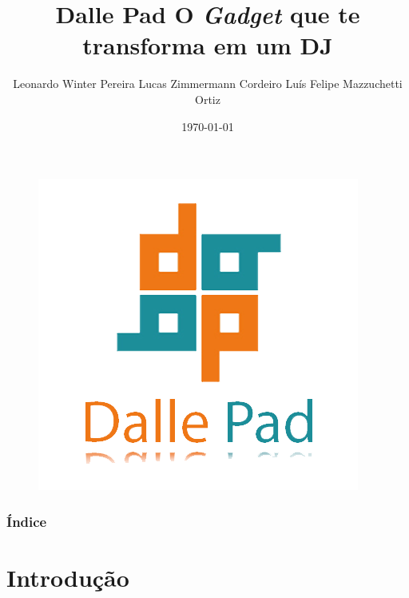 \documentclass[hyperref={pdfpagelabels=false}]{beamer}
\title{Dalle Pad \newline O \textit{Gadget} que te transforma em um DJ}
\author{Leonardo Winter Pereira \newline Lucas Zimmermann Cordeiro \newline Luís Felipe Mazzuchetti Ortiz}
\date{\today}
\begin{document}
    \begin{frame}

        \begin{figure}
            \includegraphics[scale=0.15]{Imagens/Logo01.png}
        \end{figure}
        \titlepage

    \end{frame}

    \begin{frame}\frametitle{Índice}
        \tableofcontents
    \end{frame}

        \section{Introdução}
\end{document}
